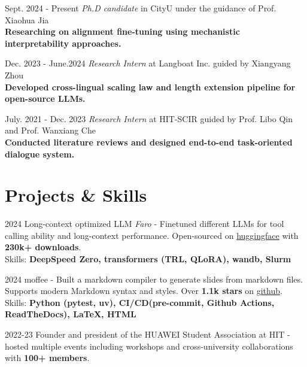 \documentclass[11pt,letterpaper]{report}
\begin{document}
\begin{tablist}
\item[Sept. 2024 - Present] \tab{}\textit{Ph.D candidate} in CityU under the guidance of Prof. Xiaohua Jia \\ 
\textbf{Researching on alignment fine-tuning using mechanistic interpretability approaches.}\\

\item[Dec. 2023 - June.2024] \tab{}\textit{Research Intern} at Langboat Inc. guided by Xiangyang Zhou \\
\textbf{Developed cross-lingual scaling law and length extension pipeline for open-source LLMs.}\\

\item[July. 2021 - Dec. 2023] \tab{}\textit{Research Intern} at HIT-SCIR guided by Prof. Libo Qin and Prof. Wanxiang Che \\
\textbf{Conducted literature reviews and designed end-to-end task-oriented dialogue system.}\\
\end{tablist}

\section*{Projects \& Skills}

\begin{tablist}

\item[2024] \tab{}Long-context optimized LLM \textit{Faro} - Finetuned different LLMs for tool calling ability and long-context performance. Open-sourced on \href{https://huggingface.co/collections/wenbopan/faro-series-660a357a3fbd33a1d09f46ca}{huggingface} with \textbf{230k+ downloads}.  \\
Skills: \textbf{DeepSpeed Zero, transformers (TRL, QLoRA), wandb, Slurm}

\item[2024] \tab{}moffee - Built a markdown compiler to generate slides from markdown files. Supports modern Markdown syntax and styles. Over \textbf{1.1k stars} on \href{https://github.com/BMPixel/moffee}{github}. \\
Skills: \textbf{Python (pytest, uv), CI/CD(pre-commit, Github Actions, ReadTheDocs), LaTeX, HTML}

\item[2022-23] \tab{}Founder and president of the HUAWEI Student Association at HIT -  hosted multiple events including workshops and cross-university collaborations with \textbf{100+ members}.

\end{tablist}
\end{document}
